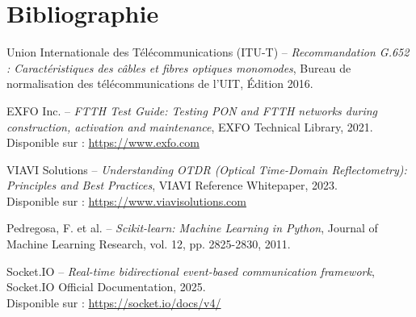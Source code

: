 \documentclass[11pt,a4paper]{article}
\begin{document}
\newpage

\section*{Bibliographie}

\begin{enumerate}[label={[\arabic*]}]
    \item Union Internationale des Télécommunications (ITU-T) -- \textit{Recommandation G.652 : Caractéristiques des câbles et fibres optiques monomodes}, Bureau de normalisation des télécommunications de l'UIT, Édition 2016.
    
    \item EXFO Inc. -- \textit{FTTH Test Guide: Testing PON and FTTH networks during construction, activation and maintenance}, EXFO Technical Library, 2021. \\
    Disponible sur : \url{https://www.exfo.com}
    
    \item VIAVI Solutions -- \textit{Understanding OTDR (Optical Time-Domain Reflectometry): Principles and Best Practices}, VIAVI Reference Whitepaper, 2023. \\
    Disponible sur : \url{https://www.viavisolutions.com}
    
    \item Pedregosa, F. et al. -- \textit{Scikit-learn: Machine Learning in Python}, Journal of Machine Learning Research, vol. 12, pp. 2825-2830, 2011.
    
    \item Socket.IO -- \textit{Real-time bidirectional event-based communication framework}, Socket.IO Official Documentation, 2025. \\
    Disponible sur : \url{https://socket.io/docs/v4/}
\end{enumerate}
\end{document}
